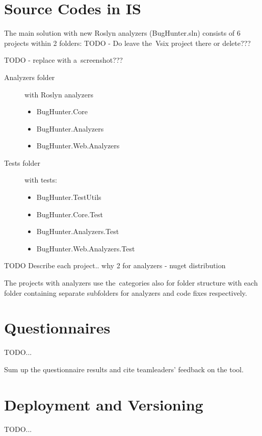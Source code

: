 \documentclass[
  digital, %
  table,   %
  lof,     %
  lot,     %
  oneside,
]{fithesis3}
\begin{document}
\appendix %
\chapter{Source Codes in IS}
\label{appendix:source-codes}
  The main solution with new Roslyn analyzers (BugHunter.sln) consists of 6 projects within 2 folders: TODO - Do leave the~Vsix project there or delete???

TODO - replace with a~screenshot???
\begin{description}
  \item[Analyzers folder] with Roslyn analyzers
  \begin{itemize}
    \item BugHunter.Core
    \item BugHunter.Analyzers
    \item BugHunter.Web.Analyzers
  \end{itemize}
  
  \item[Tests folder] with tests:
  \begin{itemize}
    \item BugHunter.TestUtils
    \item BugHunter.Core.Test
    \item BugHunter.Analyzers.Test
    \item BugHunter.Web.Analyzers.Test
  \end{itemize}
\end{description}

TODO Describe each project.. why 2 for analyzers - nuget distribution

The projects with analyzers use the~categories also for folder structure with each folder containing separate subfolders for analyzers and code fixes respectively.
  \chapter{Questionnaires}
TODO...

Sum up the questionnaire results and cite teamleaders' feedback on the tool.

\chapter{Deployment and Versioning}
\label{appendix:deployment}
TODO...
\end{document}
